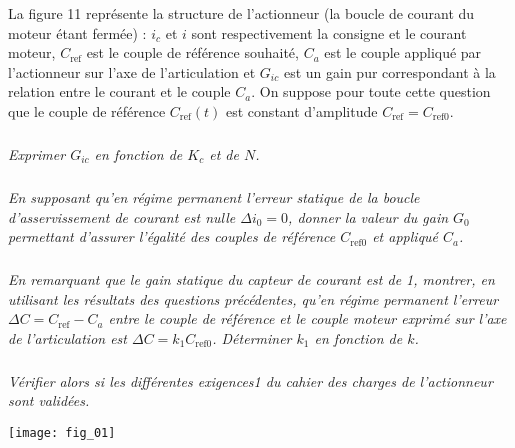 \begin{multicols}{2}
La figure 11 représente la structure de l’actionneur (la boucle de courant du moteur étant fermée) : $i_c$ et $i$
sont respectivement la consigne et le courant moteur, $C_{\text{ref}}$ est le couple de référence souhaité, $C_a$ est le couple
appliqué par l’actionneur sur l’axe de l’articulation et $G_{ic}$ est un gain pur correspondant à la relation entre le
courant et le couple $C_a$. On suppose pour toute cette question que le couple de référence $C_{\text{ref}} (t)$ est constant
d’amplitude $C_{\text{ref}} = C_{\text{ref0}}$.

\subparagraph{}\textit{Exprimer $G_{ic}$ en fonction de $K_c$ et de $N$.
}
\ifprof
\begin{corrige}
\end{corrige}
\else
\fi


\subparagraph{}\textit{
En supposant qu’en régime permanent l’erreur statique de la boucle d’asservissement de courant est nulle
$\Delta i_0= 0$, donner la valeur du gain $G_0$ permettant d’assurer l’égalité des couples de référence $C_{\text{ref0}}$ et appliqué $C_a$.}
\ifprof
\begin{corrige}
\end{corrige}
\else
\fi

\subparagraph{}\textit{
En remarquant que le gain statique du capteur de courant est de 1, montrer, en utilisant les résultats des questions précédentes, qu’en régime permanent l’erreur $\Delta C= C_{\text{ref}} -C_a$
entre le couple de référence et le couple moteur exprimé sur l’axe de l’articulation est $\Delta C= k_1C_{\text{ref0}}$. Déterminer $k_1$ en fonction de $k$.}
\ifprof
\begin{corrige}
\end{corrige}
\else
\fi


\subparagraph{}\textit{Vérifier alors si les différentes exigences1 du cahier des charges de l’actionneur sont validées.
}
\ifprof
\begin{corrige}
\end{corrige}
\else
\fi

\end{multicols}


\begin{center}
\texttt{[image: fig\_01]}
\end{center}
%
%
%
%